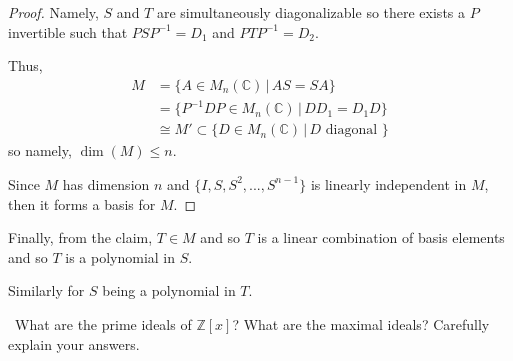 \documentclass[12pt]{AlgebraQual}
\begin{document}
\begin{solution}
\begin{claim}
\begin{proof}
Namely, $S$ and $T$ are simultaneously diagonalizable so there exists a $P$ invertible such that $PSP^{-1}=D_1$ and $PTP^{-1}=D_2$.

Thus, \begin{align*}
    M&=\{A\in M_n(\mathbb{C})\,|\, AS=SA\}\\
    &=\{P^{-1}DP\in M_n(\mathbb{C})\,|\, DD_1=D_1D\}\\
    &\cong M'\subset\{D\in M_n(\mathbb{C})\,|\, D\text{ diagonal }\}
\end{align*}
so namely, $\dim(M)\le n$.

Since $M$ has dimension $n$ and $\{I,S,S^2,...,S^{n-1}\}$ is linearly independent in $M$, then it forms a basis for $M$.
\end{proof}
\end{claim}

Finally, from the claim, $T\in M$ and so $T$ is a linear combination of basis elements and so $T$ is a polynomial in $S$.

Similarly for $S$ being a polynomial in $T$.
\end{solution}
\newpage




\begin{problem} $\,$
What are the prime ideals of $\mathbb{Z}[x]$? What are the maximal ideals? Carefully explain your answers.
\end{problem}
\end{document}
